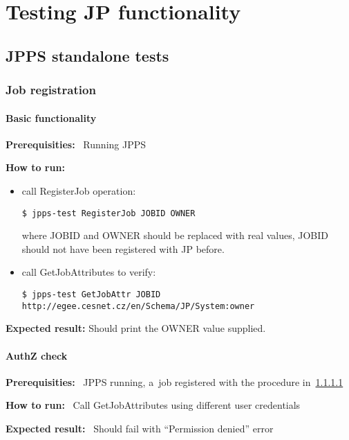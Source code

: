 \section{Testing JP functionality}

\def\req{\noindent\textbf{Prerequisities: }}
\def\how{\noindent\textbf{How to run: }}
\def\result{\noindent\textbf{Expected result: }}
\def\jpps{\noindent\textbf{JP PS log should contain: }}
\def\jpis{\noindent\textbf{JP IS log should contain: }}


\subsection{JPPS standalone tests}

\subsubsection{Job registration}

\paragraph{Basic functionality}
\label{regjob}
\req\ Running JPPS

\how
\begin{itemize}
\item call RegisterJob operation:
\begin{verbatim}
$ jpps-test RegisterJob JOBID OWNER
\end{verbatim}
where JOBID and OWNER should be replaced with real values, JOBID should not have
been registered with JP before.

\item  call GetJobAttributes to verify:
\begin{verbatim}
$ jpps-test GetJobAttr JOBID http://egee.cesnet.cz/en/Schema/JP/System:owner
\end{verbatim}
\end{itemize}
\result Should print the OWNER value supplied.

\paragraph{AuthZ check}
\req\ JPPS running, a~job registered with the procedure in~\ref{regjob}

\how\ 
Call GetJobAttributes using different user credentials 

\result\ 
Should fail with ``Permission denied'' error

